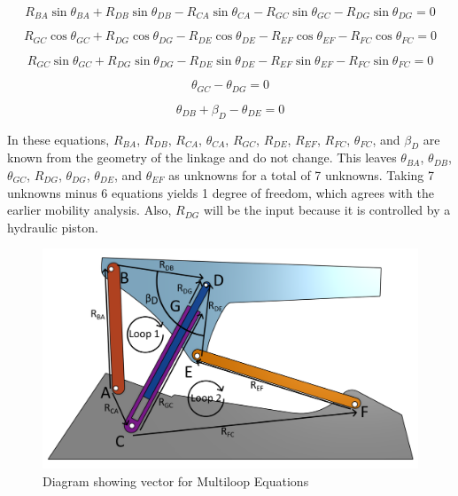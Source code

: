 \documentclass[hidelinks]{article}
\begin{document}
    \begin{equation}
        \label{eq:scalar-equation1-2}
        R_{BA}\sin\theta_{BA}+R_{DB}\sin\theta_{DB}-R_{CA}\sin\theta_{CA}-R_{GC}\sin\theta_{GC}-R_{DG}\sin\theta_{DG}=0
    \end{equation}

    \begin{equation}
        \label{eq:scalar-equation2-1}
        R_{GC}\cos\theta_{GC}+R_{DG}\cos\theta_{DG}-R_{DE}\cos\theta_{DE}-R_{EF}\cos\theta_{EF}-R_{FC}\cos\theta_{FC}=0
    \end{equation}

    \begin{equation}
        \label{eq:scalar-equation2-2}
        R_{GC}\sin\theta_{GC}+R_{DG}\sin\theta_{DG}-R_{DE}\sin\theta_{DE}-R_{EF}\sin\theta_{EF}-R_{FC}\sin\theta_{FC}=0
    \end{equation}

    \begin{equation}
        \label{eq:rigid-geometry1}
        \theta_{GC}-\theta_{DG}=0
    \end{equation}

    \begin{equation}
        \label{eq:rigid-geometry2}
        \theta_{DB}+\beta_D-\theta_{DE}=0
    \end{equation}
    
    In these equations, \(R_{BA}\), \(R_{DB}\), \(R_{CA}\), \(\theta_{CA}\), \(R_{GC}\), \(R_{DE}\), \(R_{EF}\), \(R_{FC}\), \(\theta_{FC}\), and \(\beta_D\) are known from the geometry of the linkage and do not change. This leaves \(\theta_{BA}\), \(\theta_{DB}\), \(\theta_{GC}\), \(R_{DG}\), \(\theta_{DG}\), \(\theta_{DE}\), and \(\theta_{EF}\) as unknowns for a total of 7 unknowns. Taking 7 unknowns minus 6 equations yields 1 degree of freedom, which agrees with the earlier mobility analysis. Also, \(R_{DG}\) will be the input because it is controlled by a hydraulic piston.
    
    \begin{figure}[ht]
        \centering
        \includegraphics[width=1\linewidth]{MultiLoopClosureAnnotated.png}
        \caption{Diagram showing vector for Multiloop Equations}\label{fig:multiloop}
    \end{figure}
    
\end{document}
